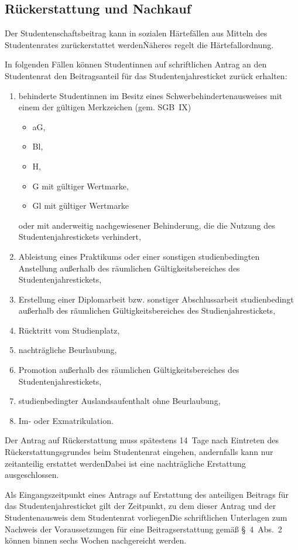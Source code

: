 \begin{multicols}{2}
\section{Rückerstattung und Nachkauf}

\Abs \Satz  Der Studentenschaftsbeitrag kann in sozialen Härtefällen aus Mitteln des Studentenrates zurückerstattet werden\. Näheres regelt die Härtefallordnung. 

\Abs \Satz  In folgenden Fällen können Studentinnen auf schriftlichen Antrag an den Studentenrat den Beitragsanteil für das Studentenjahresticket zurück erhalten:
\begin{enumerate}
\item behinderte Studentinnen im Besitz eines Schwerbehindertenausweises mit einem der gültigen Merkzeichen (gem. SGB~IX)
\renewcommand{\labelitemi}{—}
\begin{itemize}
\item aG,
\item Bl,
\item H,
\item G mit gültiger Wertmarke,
\item Gl mit gültiger Wertmarke
\end{itemize}
oder mit anderweitig nachgewiesener Behinderung, die die Nutzung des Studentenjahrestickets verhindert,
\item Ableistung eines Praktikums oder einer sonstigen studienbedingten Anstellung außerhalb des räumlichen Gültigkeitsbereiches des Studentenjahrestickets,
\item Erstellung einer Diplomarbeit bzw. sonstiger Abschlussarbeit studienbedingt außerhalb des räumlichen Gültigkeitsbereiches des Studienjahrestickets,
\item Rücktritt vom Studienplatz,
\item nachträgliche Beurlaubung,
\item Promotion außerhalb des räumlichen Gültigkeitsbereiches des Studentenjahrestickets,
\item studienbedingter Auslandsaufenthalt ohne Beurlaubung, 
\item Im- oder Exmatrikulation.
\end{enumerate}

\Abs \Satz  Der Antrag auf Rückerstattung muss spätestens 14~Tage nach Eintreten des Rückerstattungsgrundes beim Studentenrat eingehen, andernfalls kann nur zeitanteilig erstattet werden\. Dabei ist eine nachträgliche Erstattung ausgeschlossen. 

\Abs \Satz  Als Eingangszeitpunkt eines Antrags auf Erstattung des anteiligen Beitrags für das Studentenjahresticket gilt der Zeitpunkt, zu dem dieser Antrag und der Studentenausweis dem Studentenrat vorliegen\. Die schriftlichen Unterlagen zum Nachweis der Voraussetzungen für eine Beitragserstattung gemäß §~4~Abs.~2 können binnen sechs Wochen nachgereicht werden. 


\end{multicols}
